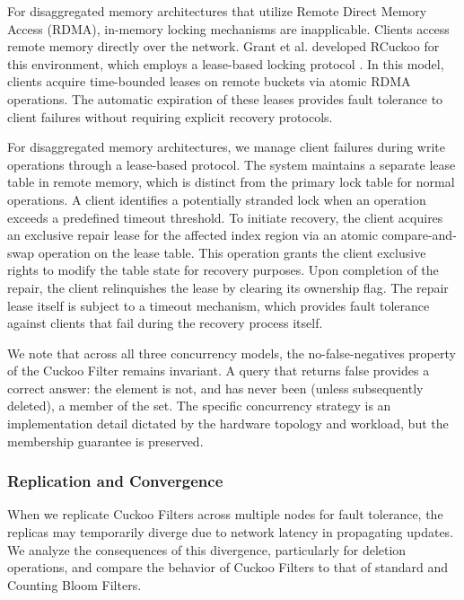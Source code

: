 For disaggregated memory architectures that utilize Remote Direct Memory Access (RDMA), in-memory locking mechanisms are inapplicable. Clients access remote memory directly over the network. Grant et al. developed RCuckoo for this environment, which employs a lease-based locking protocol \cite{Grant2025CuckooFC}. In this model, clients acquire time-bounded leases on remote buckets via atomic RDMA operations. The automatic expiration of these leases provides fault tolerance to client failures without requiring explicit recovery protocols.

\begin{definition}
    For disaggregated memory architectures, we manage client failures during write operations through a lease-based protocol. The system maintains a separate lease table in remote memory, which is distinct from the primary lock table for normal operations. A client identifies a potentially stranded lock when an operation exceeds a predefined timeout threshold. To initiate recovery, the client acquires an exclusive repair lease for the affected index region via an atomic compare-and-swap operation on the lease table. This operation grants the client exclusive rights to modify the table state for recovery purposes. Upon completion of the repair, the client relinquishes the lease by clearing its ownership flag. The repair lease itself is subject to a timeout mechanism, which provides fault tolerance against clients that fail during the recovery process itself.
\end{definition}

We note that across all three concurrency models, the no-false-negatives property of the Cuckoo Filter remains invariant. A query that returns false provides a correct answer: the element is not, and has never been (unless subsequently deleted), a member of the set. The specific concurrency strategy is an implementation detail dictated by the hardware topology and workload, but the membership guarantee is preserved.

\subsubsection{Replication and Convergence}

When we replicate Cuckoo Filters across multiple nodes for fault tolerance, the replicas may temporarily diverge due to network latency in propagating updates. We analyze the consequences of this divergence, particularly for deletion operations, and compare the behavior of Cuckoo Filters to that of standard and Counting Bloom Filters.

